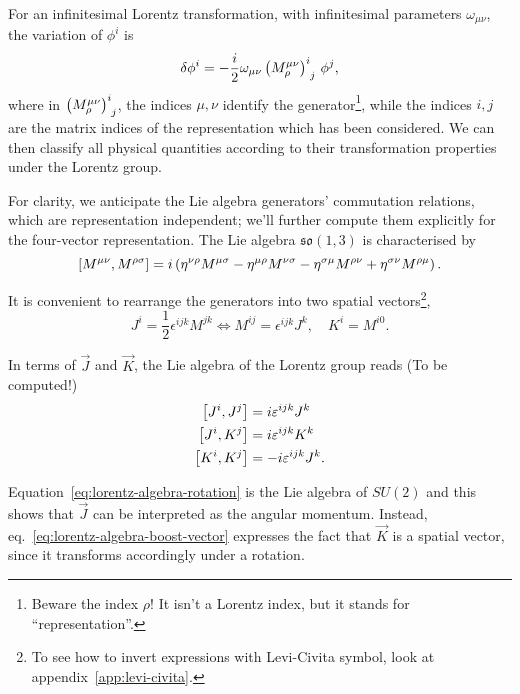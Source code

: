 For an infinitesimal Lorentz transformation, with infinitesimal parameters $\omega_{\mu\nu}$, the variation of $\phi^i$ is
\begin{equation}\label{eq:action-lorentz-transf}
    \delta \phi^i = -\frac{i}{2} \omega_{\mu\nu} \tensor{\left(  M^{\mu\nu}_\rho \right)}{^i_j} \, \phi^j, 
\end{equation}
where in $\tensor{\left(  M^{\mu\nu}_\rho \right)}{^i_j}$, the indices $\mu,\nu$ identify the generator\footnote{Beware the index $\rho$! It isn't a Lorentz index, but it stands for “representation”.}, while the indices $i,j$ are the matrix indices of the representation which has been considered. We can then classify all physical quantities according to their transformation properties under the Lorentz group.

For clarity, we anticipate the Lie algebra generators' commutation relations, which are representation independent; we'll further compute them explicitly for the four-vector representation. The Lie algebra $\mathfrak{so}(1,3)$ is characterised by
\begin{equation}\label{eq:lorentz-algebra-relations}
    \comm{M^{\mu\nu}}{M^{\rho\sigma}} = i \left( \eta^{\nu\rho} M^{\mu\sigma} - \eta^{\mu\rho} M^{\nu\sigma} - \eta^{\sigma\mu} M^{\rho\nu} + \eta^{\sigma\nu} M^{\rho\mu} \right).
\end{equation}

It is convenient to rearrange the generators into two spatial vectors\footnote{To see how to invert expressions with Levi-Civita symbol, look at appendix~\ref{app:levi-civita}.},
\begin{equation}\label{eq:redef-lorentz-gen}
    J^i = \frac{1}{2} \epsilon^{ijk} M^{jk} \iff M^{ij} = \epsilon^{ijk} J^k, \quad K^i = M^{i0} .
\end{equation}

In terms of $\vec{J}$ and $\vec{K}$, the Lie algebra of the Lorentz group reads (\color{red}To be computed!\color{black})
\begin{subequations}
\begin{align}
    \comm{J^i}{J^j} &= i \epsilon^{ijk} J^k \label{eq:lorentz-algebra-rotation} \\ 
    \comm{J^i}{K^j} &= i \epsilon^{ijk} K^k \label{eq:lorentz-algebra-boost-vector} \\ 
    \comm{K^i}{K^j} &= -i \epsilon^{ijk} J^k .
\end{align}
\end{subequations}

Equation~\eqref{eq:lorentz-algebra-rotation} is the Lie algebra of $SU(2)$ and this shows that $\vec{J}$ can be interpreted as the angular momentum. Instead, eq.~\eqref{eq:lorentz-algebra-boost-vector} expresses the fact that $\vec{K}$ is a spatial vector, since it transforms accordingly under a rotation. 

